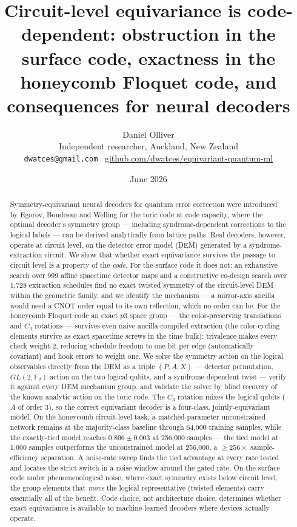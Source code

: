 \documentclass[11pt]{article}
\title{Circuit-level equivariance is code-dependent: obstruction in the
surface code, exactness in the honeycomb Floquet code, and consequences for
neural decoders}
\author{Daniel Olliver\\
\small Independent researcher, Auckland, New Zealand\\
\small \texttt{dwatces@gmail.com} \,\;
\href{https://github.com/dwatces/equivariant-quantum-ml}{\small github.com/dwatces/equivariant-quantum-ml}}
\date{June 2026}
\newcommand{\F}{\mathbb{F}}
\begin{document}
\maketitle

\begin{abstract}
\noindent
Symmetry-equivariant neural decoders for quantum error correction were
introduced by Egorov, Bondesan and Welling for the toric code at code
capacity, where the optimal decoder's symmetry group --- including
syndrome-dependent corrections to the logical labels --- can be derived
analytically from lattice paths. Real decoders, however, operate at circuit
level, on the detector error model (DEM) generated by a syndrome-extraction
circuit. We show that whether exact equivariance survives the passage to
circuit level is a property of the \emph{code}. For the surface code it does
not: an exhaustive search over 999 affine spacetime detector maps and a
constructive co-design search over 1{,}728 extraction schedules find no
exact twisted symmetry of the circuit-level DEM within the geometric
family, and we identify the
mechanism --- a mirror-axis ancilla would need a CNOT order equal to its own
reflection, which no order can be. For the honeycomb Floquet code an exact
$p3$ space group --- the color-preserving translations and $C_3$ rotations
--- survives even naive ancilla-compiled extraction (the color-cycling
elements survive as exact spacetime screws in the time bulk): trivalence
makes every check weight-2, reducing
schedule freedom to one bit per edge (automatically covariant) and hook
errors to weight one. We solve the symmetry action on the logical
observables directly from the DEM as a triple $(P, A, X)$ --- detector
permutation, $GL(2,\F_2)$ action on the two logical qubits, and a
syndrome-dependent twist --- verify it against every DEM mechanism group,
and validate the solver by blind recovery of the known analytic action on
the toric code. The $C_3$ rotation mixes the logical qubits ($A$ of order
3), so the correct equivariant decoder is a four-class, jointly-equivariant
model. On the honeycomb circuit-level task, a matched-parameter
unconstrained network remains at the majority-class baseline through 64{,}000
training samples, while the exactly-tied model reaches $0.806 \pm 0.003$ at
256{,}000 samples --- the tied model at 1{,}000 samples outperforms the
unconstrained model at 256{,}000, a $\geq 256\times$ sample-efficiency
separation. A noise-rate sweep finds the tied advantage at every rate
tested and locates the strict switch in a noise window around the gated
rate. On the surface code under phenomenological noise, where exact
symmetry exists below circuit level, the group elements that \emph{move} the
logical representative (twisted elements) carry essentially all of the
benefit. Code choice, not architecture choice, determines whether exact
equivariance is available to machine-learned decoders where devices actually
operate.
\end{abstract}
\end{document}
